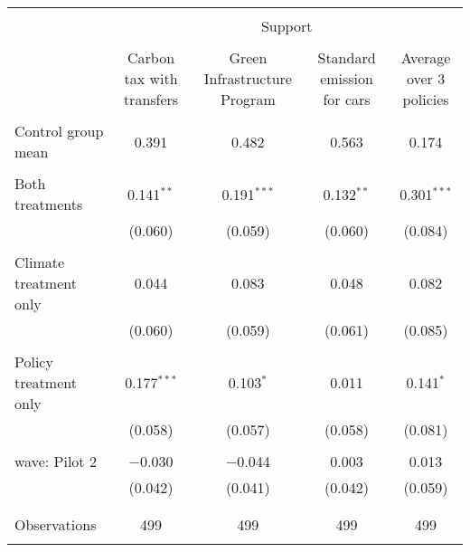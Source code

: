 
\begin{tabular}{@{\extracolsep{5pt}}lcccc} 
\\[-1.8ex]\hline 
\hline \\[-1.8ex] 
 & \multicolumn{4}{c}{Support} \\ 
\cline{2-5} 
\\[-1.8ex] & Carbon tax with transfers & Green Infrastructure Program & Standard emission for cars & Average over 3 policies \\ 
\hline \\[-1.8ex] 
 Control group mean & 0.391 & 0.482 & 0.563 & 0.174  \\ \hline \\[-1.8ex] Both treatments & 0.141$^{**}$ & 0.191$^{***}$ & 0.132$^{**}$ & 0.301$^{***}$ \\ 
  & (0.060) & (0.059) & (0.060) & (0.084) \\ 
  & & & & \\ 
 Climate treatment only & 0.044 & 0.083 & 0.048 & 0.082 \\ 
  & (0.060) & (0.059) & (0.061) & (0.085) \\ 
  & & & & \\ 
 Policy treatment only & 0.177$^{***}$ & 0.103$^{*}$ & 0.011 & 0.141$^{*}$ \\ 
  & (0.058) & (0.057) & (0.058) & (0.081) \\ 
  & & & & \\ 
 wave: Pilot 2 & $-$0.030 & $-$0.044 & 0.003 & 0.013 \\ 
  & (0.042) & (0.041) & (0.042) & (0.059) \\ 
  & & & & \\ 
\hline \\[-1.8ex] 

Observations & 499 & 499 & 499 & 499 \\ 
\hline 
\hline \\[-1.8ex] 
\end{tabular} 
